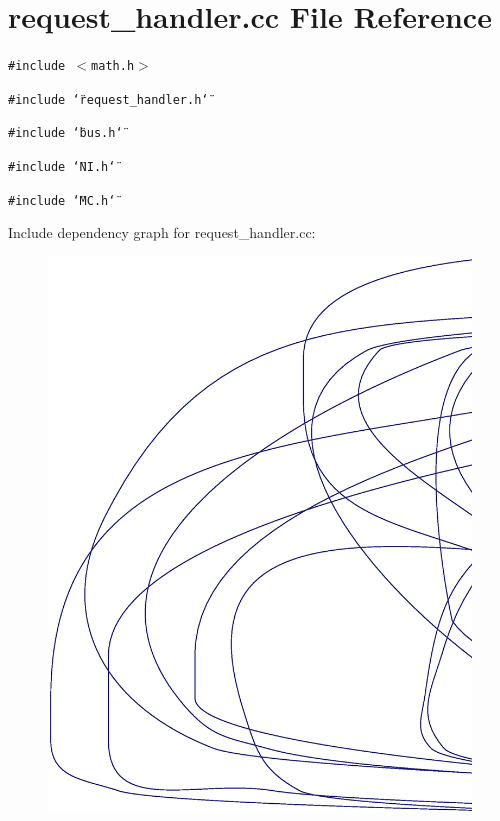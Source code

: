 \section{request\_\-handler.cc File Reference}
\label{request__handler_8cc}
{\tt \#include $<$math.h$>$}\par
{\tt \#include \char`\"{}request\_\-handler.h\char`\"{}}\par
{\tt \#include \char`\"{}bus.h\char`\"{}}\par
{\tt \#include \char`\"{}NI.h\char`\"{}}\par
{\tt \#include \char`\"{}MC.h\char`\"{}}\par


Include dependency graph for request\_\-handler.cc:\nopagebreak
\begin{figure}[H]
\begin{center}
\leavevmode
\includegraphics[width=420pt]{request__handler_8cc__incl}
\end{center}
\end{figure}
